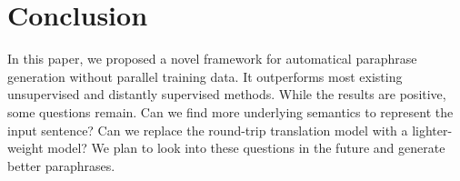 \section{Conclusion}
In this paper, we proposed a novel framework for automatical paraphrase 
generation without parallel training data. It outperforms most existing 
unsupervised and distantly supervised methods. While the results are positive, 
some questions remain. 
Can we find more underlying semantics to represent the input sentence? Can we replace the round-trip translation model with a lighter-weight model? 
We plan to look into these questions in the future and generate better paraphrases. 
